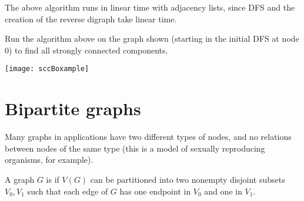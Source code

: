 %

The above algorithm runs in linear time with adjacency lists, since
DFS and the creation of the reverse digraph take linear time. 

\begin{Boxample}[7]
Run the algorithm above on the graph shown (starting in the initial DFS at node $0$) to find all strongly connected components. 
\begin{center}
\texttt{[image: sccBoxample]}
\end{center}
\end{Boxample}

\section{Bipartite graphs}

Many graphs in applications have two different types of nodes, and no
relations between nodes of the same type (this is a model of sexually
reproducing organisms, for example).

\begin{Definition}
A graph $G$ is  if $V(G)$  can be partitioned into
two nonempty disjoint subsets $V_0, V_1$ such that each edge of $G$
has one endpoint in $V_0$ and one in $V_1$.
\end{Definition}

